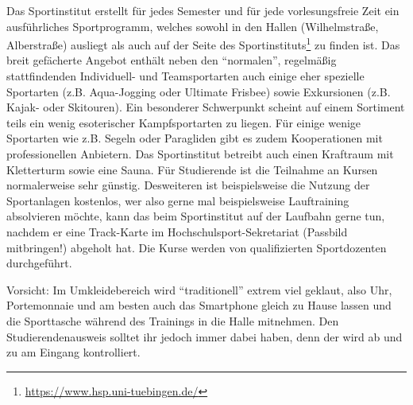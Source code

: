 
Das Sportinstitut erstellt für jedes Semester und für jede
  vorlesungsfreie Zeit ein ausführliches Sportprogramm, welches sowohl in
  den Hallen (Wilhelmstraße, Alberstraße) ausliegt als auch auf der
  Seite des Sportinstituts\footnote{
  \url{https://www.hsp.uni-tuebingen.de/}}
  zu finden ist. Das breit gefächerte Angebot enthält neben den "`normalen"', regelmäßig stattfindenden Individuell- und Teamsportarten auch einige eher spezielle Sportarten (z.B. Aqua-Jogging oder Ultimate Frisbee) sowie Exkursionen (z.B. Kajak- oder Skitouren). Ein besonderer Schwerpunkt scheint auf einem Sortiment teils ein wenig esoterischer Kampfsportarten zu liegen. Für einige wenige Sportarten wie z.B. Segeln oder Paragliden gibt es zudem Kooperationen mit professionellen Anbietern. Das Sportinstitut betreibt auch einen Kraftraum mit Kletterturm sowie eine Sauna. Für Studierende ist
  die Teilnahme an Kursen normalerweise sehr günstig. 
  Desweiteren ist beispielsweise die Nutzung der Sportanlagen kostenlos, wer also gerne mal beispielsweise Lauftraining absolvieren möchte, kann das beim Sportinstitut auf der Laufbahn gerne tun, nachdem er eine Track-Karte im Hochschulsport-Sekretariat (Passbild mitbringen!) abgeholt hat.
  Die Kurse werden von qualifizierten Sportdozenten durch\-ge\-führt.\medskip

Vorsicht: Im Umkleidebereich wird "`traditionell"' extrem viel
  geklaut, also Uhr, Portemonnaie und am besten auch das Smartphone gleich
  zu Hause lassen und die Sporttasche wäh\-rend des Trainings in
  die Halle mitnehmen. Den Studierendenausweis solltet ihr jedoch immer dabei haben, denn der wird
  ab und zu am Eingang kontrolliert.
